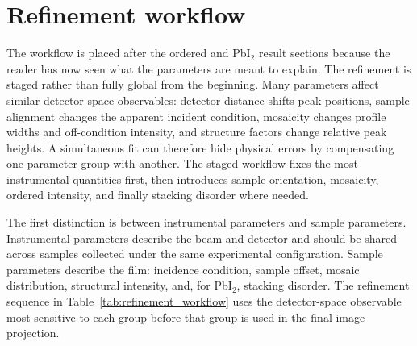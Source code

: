 \section{Refinement workflow}
\label{sec:refinement_workflow}

The workflow is placed after the ordered and PbI$_2$ result sections because the reader has now seen what the parameters are meant to explain. The refinement is staged rather than fully global from the beginning. Many parameters affect similar detector-space observables: detector distance shifts peak positions, sample alignment changes the apparent incident condition, mosaicity changes profile widths and off-condition intensity, and structure factors change relative peak heights. A simultaneous fit can therefore hide physical errors by compensating one parameter group with another. The staged workflow fixes the most instrumental quantities first, then introduces sample orientation, mosaicity, ordered intensity, and finally stacking disorder where needed.

The first distinction is between instrumental parameters and sample parameters. Instrumental parameters describe the beam and detector and should be shared across samples collected under the same experimental configuration. Sample parameters describe the film: incidence condition, sample offset, mosaic distribution, structural intensity, and, for PbI$_2$, stacking disorder. The refinement sequence in Table~\ref{tab:refinement_workflow} uses the detector-space observable most sensitive to each group before that group is used in the final image projection.

